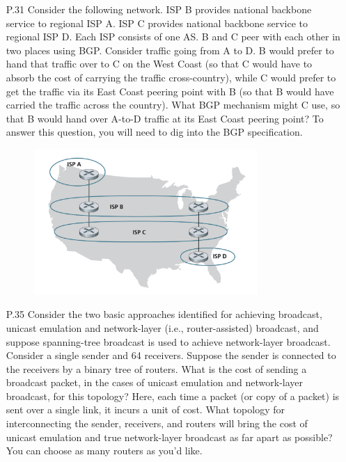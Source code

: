 \begin{enumerate}
	\item[P.31] Consider the following network. ISP B provides national backbone service to regional ISP A. ISP C provides national backbone service to regional ISP D. Each ISP consists of one AS. B and C peer with each other in two places using BGP. Consider traffic going from A to D. B would prefer to hand that traffic over to C on the West Coast (so that C would have to absorb the cost of carrying the traffic cross-country), while C would prefer to get the traffic via its East Coast peering point with B (so that B would have carried the traffic across the country). What BGP mechanism might C use, so that B would hand over A-to-D traffic at its East Coast peering point? To answer this question, you will need to dig into the BGP specification.
	
    \begin{figure}[H]
        \centering
        \includegraphics[width=0.8\textwidth]{4/P31.png}
    \end{figure}
	
	\item[P.35] Consider the two basic approaches identified for achieving broadcast, unicast emulation and network-layer (i.e., router-assisted) broadcast, and suppose spanning-tree broadcast is used to achieve network-layer broadcast. Consider a single sender and 64 receivers. Suppose the sender is connected to the receivers by a binary tree of routers. What is the cost of sending a broadcast packet, in the cases of unicast emulation and network-layer broadcast, for this topology? Here, each time a packet (or copy of a packet) is sent over a single link, it incurs a unit of cost. What topology for interconnecting the sender, receivers, and routers will bring the cost of unicast emulation and true network-layer broadcast as far apart as possible? You can choose as many routers as you'd like.
\end{enumerate}